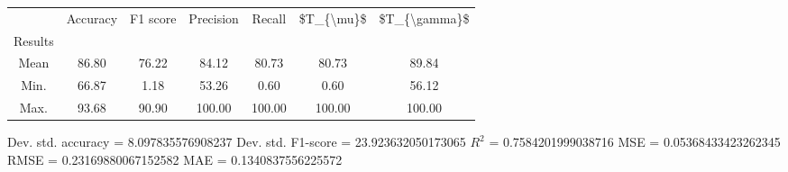 \begin{tabular}{|c|c|c|c|c|c|c|}
\toprule
{} &  Accuracy &  F1 score &  Precision &  Recall &  \$T\_\{\textbackslash mu\}\$ &  \$T\_\{\textbackslash gamma\}\$ \\
Results &           &           &            &         &            &               \\
\hline
Mean    &     86.80 &     76.22 &      84.12 &   80.73 &      80.73 &         89.84 \\
Min.    &     66.87 &      1.18 &      53.26 &    0.60 &       0.60 &         56.12 \\
Max.    &     93.68 &     90.90 &     100.00 &  100.00 &     100.00 &        100.00 \\
\bottomrule
\end{tabular}

 Dev. std. accuracy = 8.097835576908237
 Dev. std. F1-score = 23.923632050173065
 $R^2$ = 0.7584201999038716
 MSE = 0.05368433423262345
 RMSE = 0.23169880067152582
 MAE = 0.1340837556225572